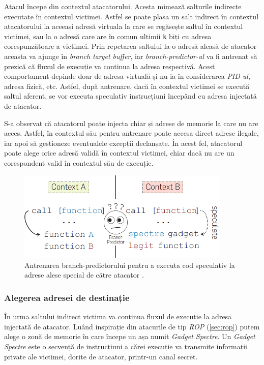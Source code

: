 Atacul începe din contextul atacatorului. Acesta mimează salturile indirecte
executate în contextul victimei. Astfel se poate plasa un salt indirect în
contextul atacatorului la aceeași adresă virtuala la care se regăsește saltul
în contextul victimei, sau la o adresă care are în comun ultimii \texttt{k}
biți cu adresa corespunzătoare a victimei. Prin repetarea saltului la o adresă
aleasă de atacator aceasta va ajunge în \emph{branch target buffer}, iar
\emph{branch-predictor-ul} va fi antrenat să prezică că fluxul de execuție va
continua la adresa respectivă. Acest comportament depinde doar de adresa
virtuală și nu ia în considerarea \emph{PID-ul}, adresa fizică, etc. Astfel,
după antrenare, dacă în contextul victimei se execută saltul aferent, se vor
executa speculativ instrucțiuni începând cu adresa injectată de atacator.

S-a observat că atacatorul poate injecta chiar și adrese de memorie la care nu
are acces. Astfel, în contextul său pentru antrenare poate accesa direct adrese
ilegale, iar apoi să gestioneze eventualele excepții declanșate. În acest fel,
atacatorul poate alege orice adresă validă în contextul victimei, chiar dacă
nu are un corespondent valid în contextul său de execuție.

\begin{figure}[ht]
	\centering
	\includegraphics[width=0.9\textwidth]{images/branch_poisoning.jpg}
	\caption{Antrenarea branch-predictorului pentru a executa cod speculativ la 
           adrese alese special de către atacator \cite{spectre2019}.}
  \label{fig:branch_poisoning}
\end{figure}

\subsubsection{Alegerea adresei de destinație}

În urma saltului indirect victima va continua fluxul de execuție la adresa
injectată de atacator. Luând inspirație din atacurile de tip \emph{ROP}
(\ref{sec:rop}) putem alege o zonă de memorie în care începe un așa numit
\emph{Gadget Spectre}. Un \emph{Gadget Spectre} este o secvență de instrucțiuni
a cărei execuție va transmite informații private ale victimei, dorite de
atacator, printr-un canal secret.

